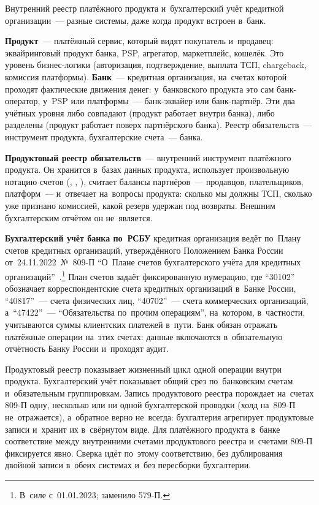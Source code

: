 Внутренний реестр платёжного продукта и~бухгалтерский учёт кредитной
организации~--- разные системы, даже когда продукт встроен в~банк.

\textbf{Продукт}~--- платёжный сервис, который видят покупатель и~продавец:
эквайринговый продукт банка, PSP, агрегатор, маркетплейс, кошелёк. Это уровень
бизнес-логики (авторизация, подтверждение, выплата ТСП, chargeback, комиссия
платформы). \textbf{Банк}~--- кредитная организация, на~счетах которой проходят
фактические движения денег: у~банковского продукта это сам
банк-оператор, у~PSP или платформы~--- банк-эквайер или банк-партнёр. Эти два
учётных уровня либо совпадают (продукт работает внутри банка), либо разделены
(продукт работает поверх партнёрского банка). Реестр обязательств~--- инструмент
продукта, бухгалтерские счета~--- банка.

\textbf{Продуктовый реестр обязательств}~--- внутренний инструмент платёжного
продукта. Он хранится в~базах данных продукта, использует произвольную нотацию
счетов (, ,
), считает балансы партнёров~--- продавцов,
плательщиков, платформ~--- и~отвечает на~вопросы продукта: сколько мы должны
ТСП, сколько уже признано комиссией, какой резерв удержан под возвраты.
Внешним бухгалтерским отчётом он не~является.

\textbf{Бухгалтерский учёт банка по~РСБУ} кредитная организация ведёт
по~Плану счетов кредитных организаций, утверждённого
Положением Банка России от~24.11.2022~№~809-П \enquote{О~Плане счетов
  бухгалтерского учёта для кредитных
организаций}~\cite{cbr-809p}.\footnote{В~силе с~01.01.2023; заменило 579-П.}
План счетов задаёт фиксированную нумерацию, где \enquote{30102} обозначает
корреспондентские счета кредитных организаций в~Банке России,
\enquote{40817}~--- счета физических лиц, \enquote{40702}~--- счета
коммерческих организаций, а~\enquote{47422}~--- \enquote{Обязательства
по~прочим операциям}, на~котором, в~частности, учитываются суммы клиентских
платежей в~пути. Банк обязан отражать платёжные операции на~этих счетах:
данные включаются в~обязательную отчётность Банку России и~проходят аудит.

Продуктовый реестр показывает жизненный цикл одной операции внутри продукта.
Бухгалтерский учёт показывает общий срез по~банковским счетам и~обязательным
группировкам. Запись продуктового реестра порождает на~счетах 809-П одну, несколько
или ни одной бухгалтерской проводки (холд на~809-П не~отражается), а~обратное верно не~всегда: бухгалтерия
агрегирует продуктовые записи и~хранит их в~свёрнутом виде. Для платёжного
продукта в~банке соответствие между внутренними счетами продуктового реестра
и~счетами 809-П фиксируется явно. Сверка идёт по~этому соответствию, без
дублирования двойной записи в~обеих системах и~без пересборки бухгалтерии.

